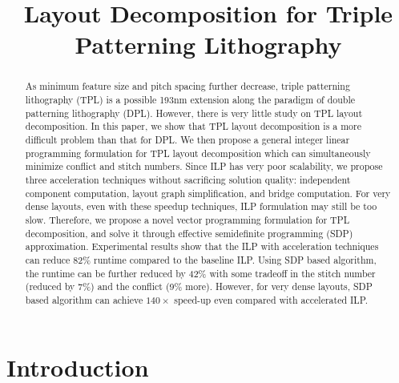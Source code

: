 \documentclass[10pt,conference]{IEEEtran}
\begin{document}
\title{\huge Layout Decomposition for Triple Patterning Lithography}

\author{
}

\maketitle

\newtheorem{problem}{\textbf{Problem}}
\newtheorem{define}{\textbf{Definition}}
\newtheorem{theorem}{\textbf{Theorem}}
\newtheorem{lemma}{\textbf{Lemma}}
\newtheorem{conjecture}{Conjecture}

\begin{abstract}
As minimum feature size and pitch spacing further decrease, triple patterning lithography (TPL) is a possible 193nm extension along the paradigm of double patterning lithography (DPL). However, there is very little study on TPL layout decomposition.  In this paper, we show that TPL layout decomposition is a more difficult problem than that for DPL. We then propose a general integer linear programming formulation for TPL layout decomposition which can simultaneously minimize conflict and stitch numbers.
Since ILP has very poor scalability,  we propose three acceleration techniques without sacrificing solution quality:
independent component computation, layout graph simplification, and bridge computation. 
For very dense layouts, even with these speedup techniques, ILP formulation may still be too slow. Therefore, we propose a novel vector programming formulation for TPL decomposition, and solve it through effective semidefinite programming (SDP) approximation.
Experimental results show that the ILP with acceleration techniques can reduce 82\% runtime compared to the baseline ILP.
Using SDP based algorithm, the runtime can be further reduced by 42\% with some tradeoff in the stitch number (reduced by 7\%) and the conflict (9\% more).  However, for very dense layouts, SDP based algorithm can achieve $140\times$ speed-up even compared with accelerated ILP.
\end{abstract}

\section{Introduction}
\end{document}
